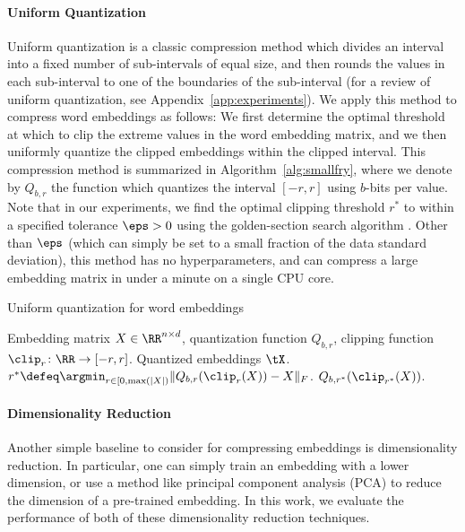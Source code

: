 \paragraph{Uniform Quantization}
Uniform quantization is a classic compression method which divides an interval into a fixed number of sub-intervals of equal size, and then rounds the values in each sub-interval to one of the boundaries of the sub-interval \citep{quant77} (for a review of uniform quantization, see Appendix~\ref{app:experiments}).
We apply this method to compress word embeddings as follows:
We first determine the optimal threshold at which to clip the extreme values in the word embedding matrix, and we then uniformly quantize the clipped embeddings within the clipped interval.
This compression method is summarized in Algorithm~\ref{alg:smallfry}, where we denote by $Q_{b,r}$ the function which quantizes the interval $[-r,r]$ using $b$-bits per value.
Note that in our experiments, we find the optimal clipping threshold $r^*$ to within a specified tolerance $\eps > 0$ using the golden-section search algorithm \citep{golden53}.
Other than $\eps$ (which can simply be set to a small fraction of the data standard deviation), this method has no hyperparameters, and can compress a large embedding matrix in under a minute on a single CPU core.

\begin{algorithm}[tb]
	\caption{Uniform quantization for word embeddings}
	\label{alg:smallfry}
	\begin{algorithmic}[1]
		  Embedding matrix $X \in \RR^{n \times d}$, quantization function $Q_{b,r}$, clipping function $\clip_r\colon\RR\rightarrow[-r,r]$.
		 Quantized embeddings $\tX$.
		\STATE $r^* \defeq \argmin_{r \in [0,\max(|X|)} \|Q_{b,r}(\clip_r(X))-X\|_F$.
		 $Q_{b,r^*}(\clip_{r^*}(X))$.
	\end{algorithmic}
\end{algorithm}

\paragraph{Dimensionality Reduction}
Another simple baseline to consider for compressing embeddings is dimensionality reduction.
In particular, one can simply train an embedding with a lower dimension, or use a method like principal component analysis (PCA) to reduce the dimension of a pre-trained embedding.
In this work, we evaluate the performance of both of these dimensionality reduction techniques.

